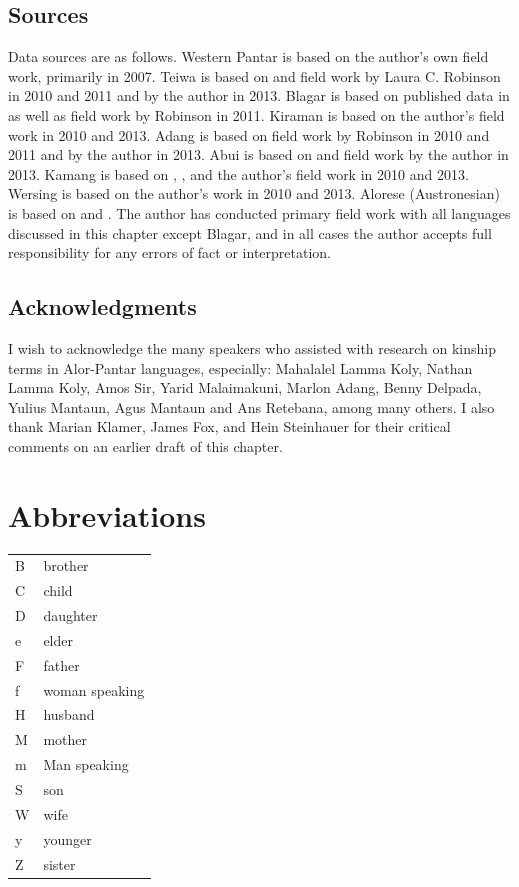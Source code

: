 \subsection*{Sources}
Data sources are as follows. Western Pantar is based on the author's own field work, primarily in 2007. Teiwa is based on \citet{Klamer2010grammar} and field work by Laura C. Robinson in 2010 and 2011 and by the author in 2013. Blagar is based on published data in \citet{Steinhauer1993} as well as field work by Robinson in 2011. Kiraman is based on the author's field work in 2010 and 2013. Adang is based on field work by Robinson in 2010 and 2011 and by the author in 2013. Abui is based on \citet{KratochvilEtAl2008kamus} and field work by the author in 2013. Kamang is based on \citet{Stokhof1977}, \citet{SchapperEtAl2011kamus}, and the author's field work in 2010 and 2013. Wersing is based on the author's work in 2010 and 2013. Alorese (Austronesian) is based on \citet{Needham1956} and \citet{Barnes1973}. The author has conducted primary field work with all languages discussed in this chapter except Blagar, and in all cases the author accepts full responsibility for any errors of fact or interpretation.

\subsection*{Acknowledgments}
I wish to acknowledge the many speakers who assisted with research on kinship terms in Alor-Pantar languages, especially: Mahalalel Lamma Koly, Nathan Lamma Koly, Amos Sir, Yarid Malaimakuni, Marlon Adang, Benny Delpada, Yulius Mantaun, Agus Mantaun and Ans Retebana, among many others. I also thank Marian Klamer, James Fox, and Hein Steinhauer for their critical comments on an earlier draft of this chapter.


\section*{Abbreviations}


\begin{tabular}{ll}
B & brother\\
C & child\\
D & daughter\\
e & elder\\
F & father\\
f & woman  speaking\\
H & husband\\
M & mother\\
m & Man speaking\\
S & son\\
W & wife\\
y & younger\\
Z & sister\\
\end{tabular}

